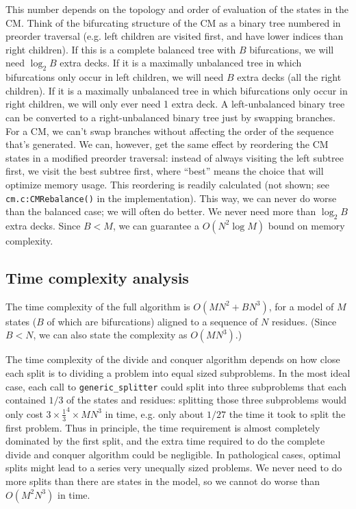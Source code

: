 \documentclass[11pt]{article}
\begin{document}
This number depends on the topology and order of evaluation of the
states in the CM. Think of the bifurcating structure of the CM as a
binary tree numbered in preorder traversal (e.g. left children are
visited first, and have lower indices than right children). If this is
a complete balanced tree with $B$ bifurcations, we will need $\log_2
B$ extra decks. If it is a maximally unbalanced tree in which
bifurcations only occur in left children, we will need $B$ extra decks
(all the right children). If it is a maximally unbalanced tree in
which bifurcations only occur in right children, we will only ever
need 1 extra deck. A left-unbalanced binary tree can be converted to a
right-unbalanced binary tree just by swapping branches. For a CM, we
can't swap branches without affecting the order of the sequence that's
generated. We can, however, get the same effect by reordering the CM
states in a modified preorder traversal: instead of always visiting
the left subtree first, we visit the best subtree first, where
``best'' means the choice that will optimize memory usage.  This
reordering is readily calculated (not shown; see
\texttt{cm.c:CMRebalance()} in the implementation).  This way, we can
never do worse than the balanced case; we will often do better. We
never need more than $\log_2 B$ extra decks. Since $B < M$, we can
guarantee a $O(N^2 \log M)$ bound on memory complexity.

\subsection{Time complexity analysis}

The time complexity of the full algorithm is $O(MN^2 + BN^3)$, for a
model of $M$ states ($B$ of which are bifurcations) aligned to a
sequence of $N$ residues. (Since $B < N$, we can also state the
complexity as $O(MN^3)$.)

The time complexity of the divide and conquer algorithm depends on how
close each split is to dividing a problem into equal sized
subproblems. In the most ideal case, each call to
\texttt{generic\_splitter} could split into three subproblems that
each contained $1/3$ of the states and residues: splitting those three
subproblems would only cost $3 \times \frac{1}{3}^4 \times MN^3$ in
time, e.g. only about $1/27$ the time it took to split the first
problem. Thus in principle, the time requirement is almost completely
dominated by the first split, and the extra time required to do the
complete divide and conquer algorithm could be negligible. In
pathological cases, optimal splits might lead to a series very
unequally sized problems. We never need to do more splits than there
are states in the model, so we cannot do worse than $O(M^2N^3)$ in
time.
\end{document}
